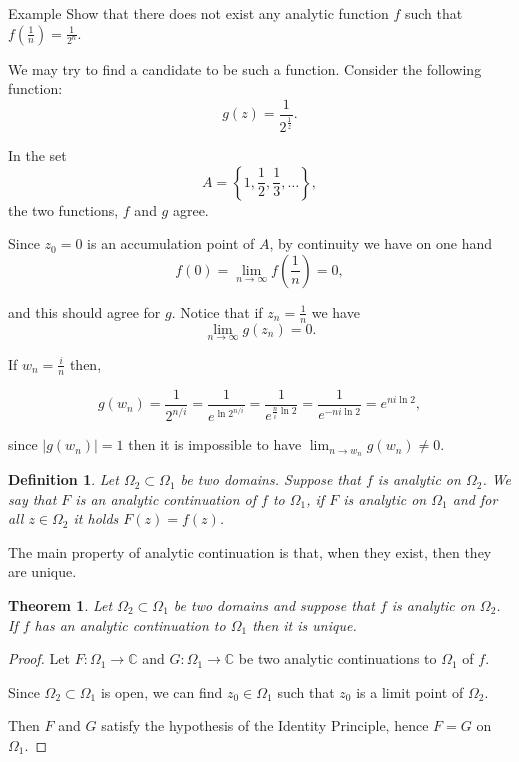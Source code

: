 \documentclass{amsart}
\newtheorem{thm}{Theorem}
\newtheorem{mydef}{Definition}
\begin{document}
\alert{Example} Show that there does not exist any analytic function \(f\) such that \(f\left(\frac{1}{n}\right) = \frac{1}{2^n}\).

We may try to find a candidate to be such a function. Consider the following function:
\[ g(z) = \frac{1}{2^{\frac{1}{z}}}. \]

In the set 
\[ A = \left\{ 1, \frac{1}{2}, \frac{1}{3}, \ldots \right\}, \]
the two functions, \(f\) and \(g\) agree.

Since \(z_0 = 0\) is an accumulation point of \(A\), by continuity we have on one hand
\[ f(0) = \lim_{n\to \infty} f\left(\frac{1}{n}\right) = 0, \]

and this should agree for \(g\). Notice that if \(z_n = \frac{1}{n}\) we have
\[\lim_{n\to \infty}g(z_n) = 0.\]

If \(w_n = \frac{i}{n}\) then, 

\[ g(w_n) = \frac{1}{2^{n/i}} = \frac{1}{e^{\ln{2^{n/i}}}} = \frac{1}{e^{\frac{n}{i}\ln{2}}}= \frac{1}{e^{-ni\ln{2}}} = e^{ni\ln{2}},\]

since \(|g(w_n)| = 1\) then it is impossible to have \(\lim_{n\to w_n} g(w_n) \neq 0\).


\begin{mydef}
Let \(\Omega_2\subset\Omega_1\) be two domains. Suppose that \(f\) is analytic on \(\Omega_2\). We say that \(F\) is an analytic continuation of \(f\) to \(\Omega_1\), if \(F\) is analytic on \(\Omega_1\) and for all \(z\in \Omega_2\) it holds \(F(z) = f(z)\).
\end{mydef}

The main property of analytic continuation is that, when they exist, then they are unique.

\begin{thm}
Let \(\Omega_2\subset\Omega_1\) be two domains and suppose that \(f\) is analytic on \(\Omega_2\). If \(f\) has an analytic continuation to \(\Omega_1\) then it is unique.
\end{thm}

\begin{proof}
Let \(F:\Omega_1 \to \mathbb{C}\) and \(G:\Omega_1\to \mathbb{C}\) be two analytic continuations to \(\Omega_1\) of \(f\).

Since \(\Omega_2 \subset \Omega_1\) is open, we can find \(z_0\in \Omega_1\) such that \(z_0\) is a limit point of \(\Omega_2\).

Then \(F\) and \(G\) satisfy the hypothesis of the Identity Principle, hence \(F=G\) on \(\Omega_1\).
\end{proof}
\end{document}
